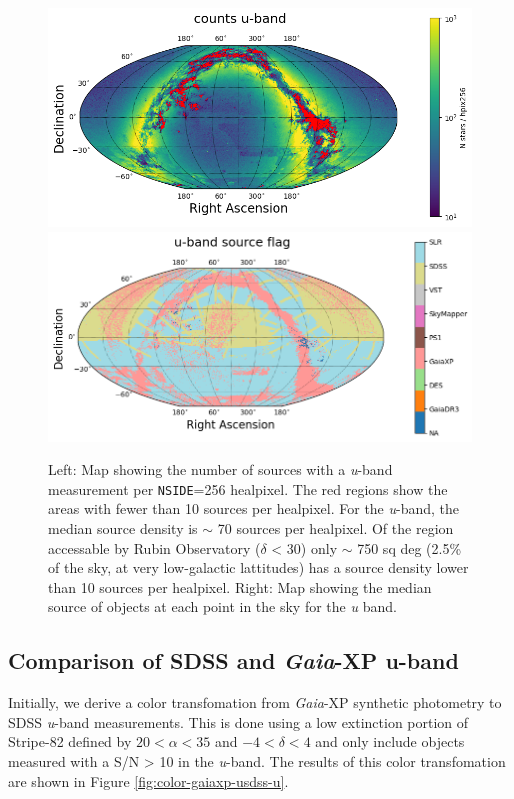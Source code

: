 \begin{figure}
    \includegraphics[width=0.48\linewidth]{./figures/source_density_maps/u-band_counts_full.png}
    \includegraphics[width=0.48\linewidth]{./figures/source_survey_maps/u-band_source.png}
    \caption{Left: Map showing the number of sources with a \textit{u}-band measurement per \texttt{NSIDE}=256 healpixel.
    The red regions show the areas with fewer than 10 sources per healpixel. For the \emph{u}-band, the median source density is $\sim$ 70 sources per healpixel. Of the region accessable by Rubin Observatory ($\delta$ < 30) only $\sim$ 750 sq deg (2.5\% of the sky, at very low-galactic lattitudes) has a source density lower than 10 sources per healpixel.
    Right: Map showing the median source of objects at each point in the sky for the \textit{u} band.}
    \label{fig:monster-u}
\end{figure}

\subsection{Comparison of SDSS and \emph{Gaia}-XP u-band}
Initially, we derive a color transfomation from \emph{Gaia}-XP synthetic photometry to SDSS \textit{u}-band measurements. 
This is done using a low extinction portion of Stripe-82 defined by $20 < \alpha < 35$ and $-4 < \delta < 4$ and only include objects measured with a S/N > 10 in the \textit{u}-band. 
The results of this color transfomation are shown in Figure \ref{fig:color-gaiaxp-usdss-u}. 

